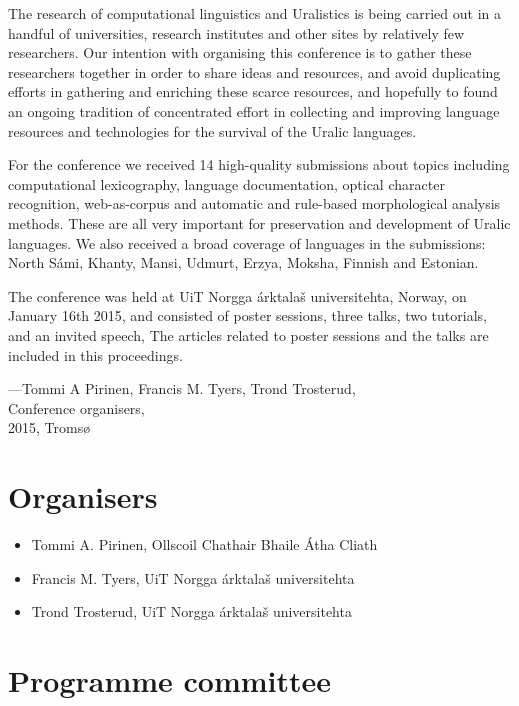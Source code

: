 \documentclass[b5paper]{book}
\newcommand\thedoi{10.7557/scs.2015.2}
\begin{document}
The research of computational linguistics and Uralistics is being carried out
in a handful of universities, research institutes and other sites by
relatively few researchers. Our intention with organising this conference is to
gather these researchers together in order to share ideas and resources, and
avoid duplicating efforts in gathering and enriching these scarce resources,
and hopefully to found an ongoing tradition of concentrated effort in
collecting and improving language resources and technologies for the survival
of the Uralic languages.

For the conference we received 14 high-quality submissions about topics
including computational lexicography, language documentation, optical character
recognition, web-as-corpus and automatic and rule-based morphological analysis
methods.  These are all very important for preservation and development of
Uralic languages. We also received a broad coverage of languages in the
submissions: North Sámi, Khanty, Mansi, Udmurt, Erzya, Moksha, Finnish and
Estonian.

The conference was held at UiT Norgga árktalaš universitehta, Norway, on
January 16th 2015, and consisted of poster sessions, three talks, two
tutorials, and an invited speech, The articles related to poster sessions and
the talks are included in this proceedings.

\noindent ---Tommi A Pirinen, Francis M. Tyers, Trond Trosterud,\\
Conference organisers,\\
2015, Tromsø

\renewcommand\thedoi{10.7557/5.3463}

\chapter*{Organisers}

\begin{itemize}
    \item Tommi A. Pirinen, Ollscoil Chathair Bhaile Átha Cliath
    \item Francis M. Tyers, UiT Norgga árktalaš universitehta
    \item Trond Trosterud, UiT Norgga árktalaš universitehta
\end{itemize}

\renewcommand\thedoi{10.7557/5.3464}

\chapter*{Programme committee}
\end{document}
